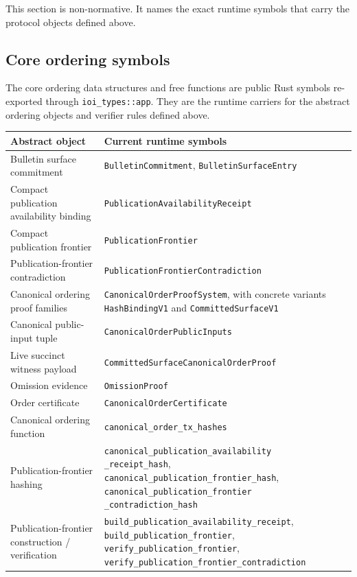 \documentclass[11pt]{article}
\newcommand{\code}[1]{\texttt{#1}}
\begin{document}
This section is non-normative. It names the exact runtime symbols that carry
the protocol objects defined above.

\subsection{Core ordering symbols}

The core ordering data structures and free functions are public Rust symbols
re-exported through \code{ioi\_types::app}. They are the runtime carriers for
the abstract ordering objects and verifier rules defined above.

\begin{center}
\scriptsize
\begin{tabularx}{\textwidth}{>{\raggedright\arraybackslash}p{} X}
\toprule
\textbf{Abstract object} & \textbf{Current runtime symbols} \\
\midrule
Bulletin surface commitment & \code{BulletinCommitment}, \code{BulletinSurfaceEntry} \\
Compact publication availability binding & \code{PublicationAvailabilityReceipt} \\
Compact publication frontier & \code{PublicationFrontier} \\
Publication-frontier contradiction & \code{PublicationFrontierContradiction} \\
Canonical ordering proof families & \code{CanonicalOrderProofSystem}, with concrete variants \code{HashBindingV1} and \code{CommittedSurfaceV1} \\
Canonical public-input tuple & \code{CanonicalOrderPublicInputs} \\
Live succinct witness payload & \code{CommittedSurfaceCanonicalOrderProof} \\
Omission evidence & \code{OmissionProof} \\
Order certificate & \code{CanonicalOrderCertificate} \\
Canonical ordering function & \code{canonical\_order\_tx\_hashes} \\
Publication-frontier hashing & \shortstack[l]{\code{canonical\_publication\_availability}\\\code{\_receipt\_hash},\\\code{canonical\_publication\_frontier\_hash},\\\code{canonical\_publication\_frontier}\\\code{\_contradiction\_hash}} \\
Publication-frontier construction / verification & \shortstack[l]{\code{build\_publication\_availability\_receipt},\\\code{build\_publication\_frontier},\\\code{verify\_publication\_frontier},\\\code{verify\_publication\_frontier\_contradiction}} \\

\end{tabularx}
\end{center}
\end{document}
